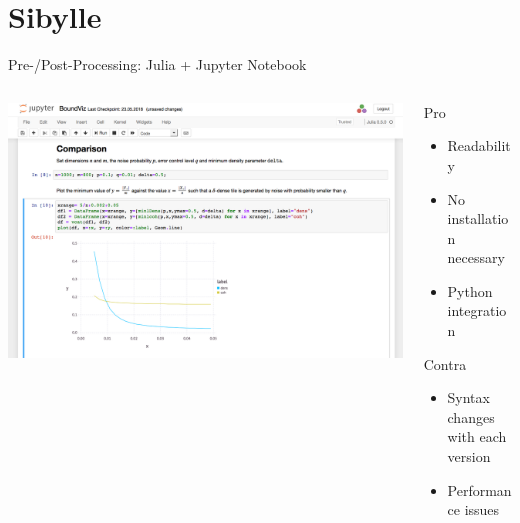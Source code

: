 \documentclass[aspectratio=169,10pt]{beamer}
\begin{document}
\section{Sibylle}
\begin{frame}[fragile]{Pre-/Post-Processing: Julia + Jupyter Notebook}
\begin{columns}
\begin{column}{0.7\textwidth}
\includegraphics[width=\textwidth]{img/sibyJuliaNotebook.png}
\end{column}
\begin{column}{0.25\textwidth}
\begin{alertblock}{Pro}
\begin{itemize}
    \item Readability
    \item No installation necessary
    \item Python integration
\end{itemize}
\end{alertblock}
\begin{block}{Contra}
\begin{itemize}
    \item Syntax changes with each version
    \item Performance issues
\end{itemize}
\end{block}
\end{column}
\end{columns}
\end{frame}
\end{document}

